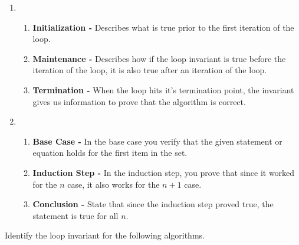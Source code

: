 \documentclass[9pt]{article}
\begin{document}
        \begin{enumerate}
            \item 
            \begin{enumerate}
                \item \textbf{Initialization -} 
                Describes what is true prior to the first iteration of the loop.
                \item \textbf{Maintenance -} 
                Describes how if the loop invariant is true before the iteration of the loop, it is also true after an iteration of the loop.
                \item \textbf{Termination -} 
                When the loop hits it's termination point, the invariant gives us information to prove that the algorithm is correct.
            \end{enumerate}
            \bigskip\bigskip
            \item 
            \begin{enumerate}
                \item \textbf{Base Case -} 
                In the base case you verify that the given statement or equation holds for the first item in the set.
                \item \textbf{Induction Step -} 
                In the induction step, you prove that since it worked for the $n$ case, it also works for the $n+1$ case.
                \item \textbf{Conclusion -} 
                State that since the induction step proved true, the statement is true for all $n$.
            \end{enumerate}
        \end{enumerate}
        
        \fi
        
        \newpage
        
        
        
        
        
\vspace{5mm}
\item
Identify the loop invariant for the following algorithms.
\end{document}
